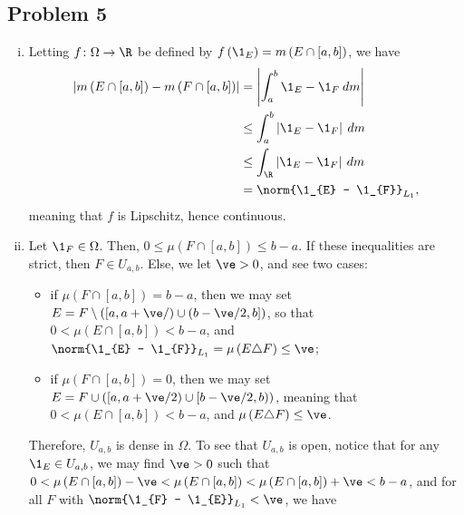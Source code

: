 \documentclass[10pt]{mypackage}
\begin{document}
\subsection{Problem 5}%
\begin{enumerate}[(i)]
  \item Letting $f\colon \Omega\rightarrow \R$ be defined by $f\left( \1_E \right) = m\left( E\cap [a,b] \right)$, we have
    \begin{align*}
      \left\vert m\left( E\cap [a,b] \right) - m\left( F\cap [a,b] \right) \right\vert &= \left\vert \int_{a}^{b} \1_{E} - \1_{F}\:dm \right\vert\\
                                                                                       &\leq \int_{a}^{b} \left\vert \1_{E} - \1_{F} \right\vert\:dm\\
                                                                                       &\leq \int_{\R}^{} \left\vert \1_{E} - \1_{F} \right\vert\:dm\\
                                                                                       &= \norm{\1_{E} - \1_{F}}_{L_1},
    \end{align*}
    meaning that $f$ is Lipschitz, hence continuous.
  \item Let $\1_{F}\in \Omega$. Then, $0 \leq \mu\left( F\cap [a,b] \right)\leq b-a$. If these inequalities are strict, then $F\in U_{a,b}$. Else, we let $\ve > 0$, and see two cases:
    \begin{itemize}
      \item if $\mu\left( F\cap [a,b] \right) = b-a$, then we may set $E = F\setminus \left( \left[a,a+\ve/\right)\cup \left( b-\ve/2,b \right] \right)$, so that $0 < \mu\left( E\cap [a,b] \right) < b-a$, and $\norm{\1_{E} - \1_{F}}_{L_1} = \mu\left( E\triangle F \right) \leq \ve$;
      \item if $\mu\left( F\cap [a,b] \right) = 0$, then we may set $E = F\cup \left( \left[ a,a+\ve/2 \right)\cup \left[ b-\ve/2,b \right) \right)$, meaning that $0 < \mu\left( E\cap [a,b] \right) < b-a$, and $\mu\left( E\triangle F \right) \leq \ve$.
    \end{itemize}
    Therefore, $U_{a,b}$ is dense in $\Omega$. To see that $U_{a,b}$ is open, notice that for any $\1_{E}\in U_{a,b}$, we may find $\ve > 0$ such that $0 < \mu\left( E\cap [a,b] \right) - \ve < \mu\left( E\cap [a,b] \right) < \mu\left( E\cap [a,b] \right) + \ve < b-a$, and for all $F$ with $\norm{\1_{F} - \1_{E}}_{L_1} < \ve$, we have
    \begin{align*}

\end{align*}
\end{enumerate}
\end{document}
